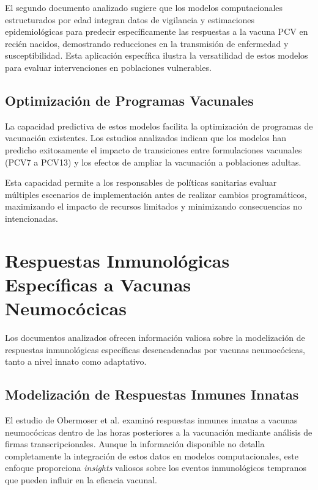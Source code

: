 El segundo documento analizado sugiere que los modelos computacionales estructurados por edad integran datos de vigilancia y estimaciones epidemiológicas para predecir específicamente las respuestas a la vacuna PCV en recién nacidos, demostrando reducciones en la transmisión de enfermedad y susceptibilidad. Esta aplicación específica ilustra la versatilidad de estos modelos para evaluar intervenciones en poblaciones vulnerables.

\subsection{Optimización de Programas Vacunales}

La capacidad predictiva de estos modelos facilita la optimización de programas de vacunación existentes. Los estudios analizados indican que los modelos han predicho exitosamente el impacto de transiciones entre formulaciones vacunales (PCV7 a PCV13) y los efectos de ampliar la vacunación a poblaciones adultas.

Esta capacidad permite a los responsables de políticas sanitarias evaluar múltiples escenarios de implementación antes de realizar cambios programáticos, maximizando el impacto de recursos limitados y minimizando consecuencias no intencionadas.

\section{Respuestas Inmunológicas Específicas a Vacunas Neumocócicas}

Los documentos analizados ofrecen información valiosa sobre la modelización de respuestas inmunológicas específicas desencadenadas por vacunas neumocócicas, tanto a nivel innato como adaptativo.

\subsection{Modelización de Respuestas Inmunes Innatas}

El estudio de Obermoser et al. \cite{Obermoser2013} examinó respuestas inmunes innatas a vacunas neumocócicas dentro de las horas posteriores a la vacunación mediante análisis de firmas transcripcionales. Aunque la información disponible no detalla completamente la integración de estos datos en modelos computacionales, este enfoque proporciona \textit{insights} valiosos sobre los eventos inmunológicos tempranos que pueden influir en la eficacia vacunal.

